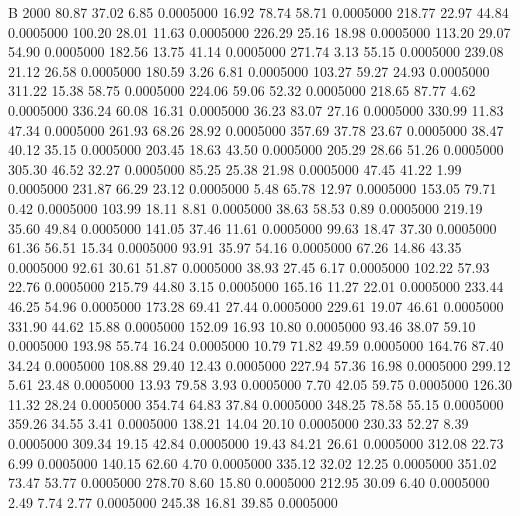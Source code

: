 


B 2000
  80.87   37.02    6.85   0.0005000
  16.92   78.74   58.71   0.0005000
 218.77   22.97   44.84   0.0005000
 100.20   28.01   11.63   0.0005000
 226.29   25.16   18.98   0.0005000
 113.20   29.07   54.90   0.0005000
 182.56   13.75   41.14   0.0005000
 271.74    3.13   55.15   0.0005000
 239.08   21.12   26.58   0.0005000
 180.59    3.26    6.81   0.0005000
 103.27   59.27   24.93   0.0005000
 311.22   15.38   58.75   0.0005000
 224.06   59.06   52.32   0.0005000
 218.65   87.77    4.62   0.0005000
 336.24   60.08   16.31   0.0005000
  36.23   83.07   27.16   0.0005000
 330.99   11.83   47.34   0.0005000
 261.93   68.26   28.92   0.0005000
 357.69   37.78   23.67   0.0005000
  38.47   40.12   35.15   0.0005000
 203.45   18.63   43.50   0.0005000
 205.29   28.66   51.26   0.0005000
 305.30   46.52   32.27   0.0005000
  85.25   25.38   21.98   0.0005000
  47.45   41.22    1.99   0.0005000
 231.87   66.29   23.12   0.0005000
   5.48   65.78   12.97   0.0005000
 153.05   79.71    0.42   0.0005000
 103.99   18.11    8.81   0.0005000
  38.63   58.53    0.89   0.0005000
 219.19   35.60   49.84   0.0005000
 141.05   37.46   11.61   0.0005000
  99.63   18.47   37.30   0.0005000
  61.36   56.51   15.34   0.0005000
  93.91   35.97   54.16   0.0005000
  67.26   14.86   43.35   0.0005000
  92.61   30.61   51.87   0.0005000
  38.93   27.45    6.17   0.0005000
 102.22   57.93   22.76   0.0005000
 215.79   44.80    3.15   0.0005000
 165.16   11.27   22.01   0.0005000
 233.44   46.25   54.96   0.0005000
 173.28   69.41   27.44   0.0005000
 229.61   19.07   46.61   0.0005000
 331.90   44.62   15.88   0.0005000
 152.09   16.93   10.80   0.0005000
  93.46   38.07   59.10   0.0005000
 193.98   55.74   16.24   0.0005000
  10.79   71.82   49.59   0.0005000
 164.76   87.40   34.24   0.0005000
 108.88   29.40   12.43   0.0005000
 227.94   57.36   16.98   0.0005000
 299.12    5.61   23.48   0.0005000
  13.93   79.58    3.93   0.0005000
   7.70   42.05   59.75   0.0005000
 126.30   11.32   28.24   0.0005000
 354.74   64.83   37.84   0.0005000
 348.25   78.58   55.15   0.0005000
 359.26   34.55    3.41   0.0005000
 138.21   14.04   20.10   0.0005000
 230.33   52.27    8.39   0.0005000
 309.34   19.15   42.84   0.0005000
  19.43   84.21   26.61   0.0005000
 312.08   22.73    6.99   0.0005000
 140.15   62.60    4.70   0.0005000
 335.12   32.02   12.25   0.0005000
 351.02   73.47   53.77   0.0005000
 278.70    8.60   15.80   0.0005000
 212.95   30.09    6.40   0.0005000
   2.49    7.74    2.77   0.0005000
 245.38   16.81   39.85   0.0005000
